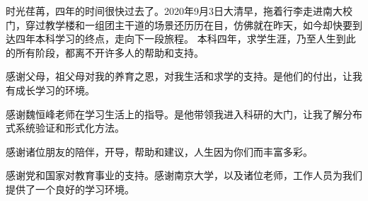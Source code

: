 \documentclass[
    type = bachelor,
    degree = academic,
    twoside,
    fontset = win,
    decl-page
]
{njuthesis}
\begin{document}
\begin{acknowledgement}
时光荏苒，四年的时间很快过去了。2020年9月3日大清早，拖着行李走进南大校门，穿过教学楼和一组团主干道的场景还历历在目，仿佛就在昨天，如今却快要到达四年本科学习的终点，走向下一段旅程。
本科四年，求学生涯，乃至人生到此的所有阶段，都离不开许多人的帮助和支持。

感谢父母，祖父母对我的养育之恩，对我生活和求学的支持。是他们的付出，让我有成长学习的环境。

感谢魏恒峰老师在学习生活上的指导。是他带领我进入科研的大门，让我了解分布式系统验证和形式化方法。

感谢诸位朋友的陪伴，开导，帮助和建议，人生因为你们而丰富多彩。

感谢党和国家对教育事业的支持。感谢南京大学，以及诸位老师，工作人员为我们提供了一个良好的学习环境。

\end{acknowledgement}

\end{document}
